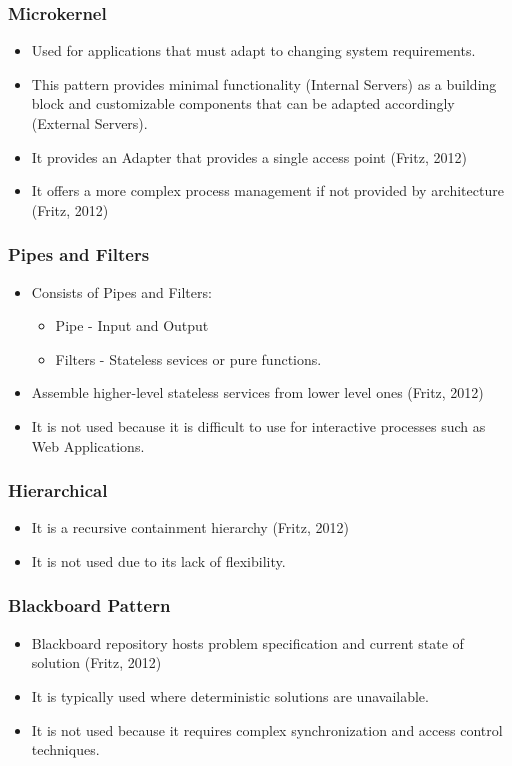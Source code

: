 \documentclass[a4paper,12pt]{article}
\begin{document}
\subsubsection{Microkernel}
\begin{itemize}
\item Used for applications that must adapt to changing system requirements.
\item This pattern provides minimal functionality (Internal Servers) as a building block and customizable components that can be adapted accordingly (External Servers).
\item It provides an Adapter that provides a single access point (Fritz, 2012)
\item It offers a more complex process management if not provided by architecture (Fritz, 2012)
\end{itemize}

\subsubsection{Pipes and Filters}
\begin{itemize}
\item Consists of Pipes and Filters:
\begin{itemize}
\item Pipe - Input and Output
\item Filters - Stateless sevices or pure functions.
\end{itemize}
\item Assemble higher-level stateless services from lower level ones (Fritz, 2012)
\item It is not used because it is difficult to use for interactive processes such as Web Applications.

\end{itemize}

\subsubsection{Hierarchical}
\begin{itemize}
\item It is a recursive containment hierarchy (Fritz, 2012)
\item It is not used due to its lack of flexibility.
\end{itemize}

\subsubsection{Blackboard Pattern}
\begin{itemize}
\item Blackboard repository hosts problem specification and current state of solution (Fritz, 2012)
\item It is typically used where deterministic solutions are unavailable.
\item It is not used because it requires complex synchronization and access control techniques. 
\end{itemize}
\end{document}
